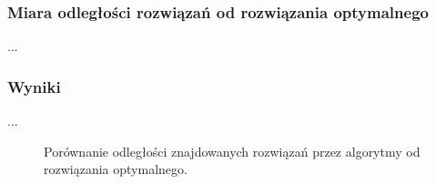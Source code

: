 \subsubsection{Miara odległości rozwiązań od rozwiązania optymalnego}

...

\subsubsection{Wyniki}

...

\begin{figure}
\begin{center}
\end{center}
\caption{Porównanie odległości znajdowanych rozwiązań przez algorytmy od rozwiązania optymalnego.}
\label{fig:dist}
\end{figure}